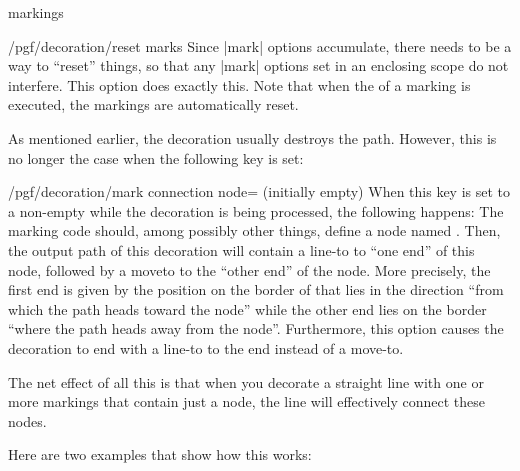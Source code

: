 \begin{decoration}{markings}
    \begin{key}{/pgf/decoration/reset marks}
        Since |mark| options accumulate, there needs to be a way to ``reset''
        things, so that any |mark| options set in an enclosing scope do not
        interfere. This option does exactly this. Note that when the
         of a marking is executed, the markings are automatically
        reset.
    \end{key}

    As mentioned earlier, the decoration usually destroys the path. However,
    this is no longer the case when the following key is set:
    \begin{key}{/pgf/decoration/mark connection node= (initially empty)}
        When this key is set to a non-empty  while the
        decoration is being processed, the following happens: The marking code
        should, among possibly other things, define a node named . Then, the output path of this decoration will contain a line-to
        to ``one end'' of this node, followed by a moveto to the ``other end''
        of the node. More precisely, the first end is given by the position on
        the border of  that lies in the direction ``from which
        the path heads toward the node'' while the other end lies on the border
        ``where the path heads away from the node''. Furthermore, this option
        causes the decoration to end with a line-to to the end instead of a
        move-to.

        The net effect of all this is that when you decorate a straight line
        with one or more markings that contain just a node, the line will
        effectively connect these nodes.

        Here are two examples that show how this works:
\begin{codeexample}[preamble={\usetikzlibrary{decorations.markings}}]
\end{codeexample}

\begin{codeexample}[preamble={\usetikzlibrary{decorations.markings}}]
\end{codeexample}
    \end{key}
\end{decoration}


